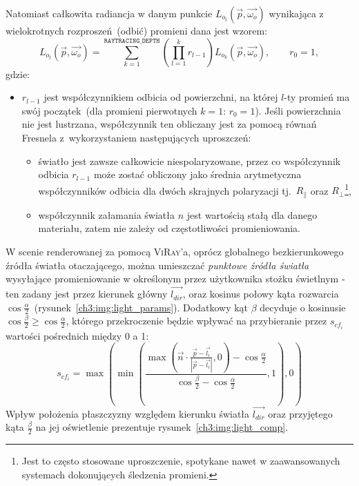 \begin{enumerate}
Natomiast całkowita radiancja w danym punkcie $L_{o_t}(\vec{p}, \vec{\omega_o})$ wynikająca z wielokrotnych rozproszeń~(odbić) promieni dana jest wzorem:
\begin{equation}
L_{o_t}(\vec{p}, \vec{\omega_o}) = \sum_{k=1}^{\mathtt{RAYTRACING\_DEPTH}}\left(\prod_{l=1}^k r_{l-1} \right)L_{o_k}(\vec{p}, \vec{\omega_o}), \qquad r_0 = 1,
\label{ch3:eq:total_radiance}
\end{equation}
gdzie:
\begin{itemize}
\item[] $r_{l-1}$ jest współczynnikiem odbicia od powierzchni, na której $l$-ty promień ma swój początek~(dla promieni pierwotnych $k=1$: $r_0=1$). Jeśli powierzchnia nie jest lustrzana, współczynnik ten obliczany jest za pomocą równań Fresnela z~wykorzystaniem następujących uproszczeń:
\begin{itemize}
\item światło jest zawsze całkowicie niespolaryzowane, przez co współczynnik odbicia $r_{l-1}$ może zostać obliczony jako średnia arytmetyczna współczynników odbicia dla dwóch skrajnych polaryzacji tj.~$R_\parallel$ oraz $R_\perp$\footnote{Jest to często stosowane uproszczenie, spotykane nawet w zaawansowanych systemach dokonujących śledzenia promieni.},
\item współczynnik załamania światła $n$ jest wartością stałą dla danego materiału, zatem nie zależy od częstotliwości promieniowania.
\end{itemize}
\end{itemize}

W scenie renderowanej za pomocą \textsc{ViRay}'a, oprócz globalnego bezkierunkowego źródła światła otaczającego, można umieszczać \textit{punktowe źródła światła} wysyłające promieniowanie w określonym przez użytkownika stożku świetlnym - ten zadany jest przez kierunek główny $\overrightarrow{l_{dir}}$, oraz kosinus połowy kąta rozwarcia $\cos \frac{\alpha}{2}$~(rysunek~\ref{ch3:img:light_params}). Dodatkowy kąt $\beta$ decyduje o kosinusie $\cos\frac{\beta}{2} \geq \cos\frac{\alpha}{2}$, którego przekroczenie będzie wpływać na przybieranie przez $s_{cf_i}$ wartości pośrednich między 0 a 1:
\begin{equation}
s_{cf_i} = \max\left(\min\left(  \frac{\max\left(\vec{n} \cdot \frac{\vec{p} - \vec{l_i}}{|\vec{p} - \vec{l_i}|}  , 0\right) - \cos\frac{\alpha}{2}}{\cos\frac{\beta}{2} - \cos\frac{\alpha}{2}}, 1\right), 0\right)
\end{equation}
Wpływ położenia płaszczyzny względem kierunku światła $\overrightarrow{l_{dir}}$ oraz przyjętego kąta $\frac{\beta}{2}$ na jej oświetlenie prezentuje rysunek~\ref{ch3:img:light_comp}.


\end{enumerate}
